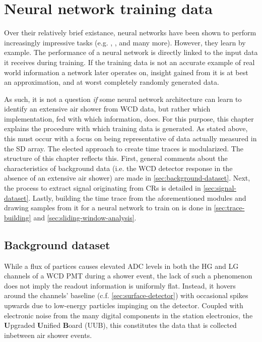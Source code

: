 

\chapter{Neural network training data}
\label{chap:neural-network-data}

Over their relatively brief existance, neural networks have been shown to perform increasingly impressive tasks (e.g.  \cite{openai2019dota}, \cite{openai2023gpt4}, 
and many more). However, they learn by example. The performance of a neural network is directly linked to the input data it receives during training. If the 
training data is not an accurate example of real world information a network later operates on, insight gained from it is at best an approximation, and at worst
completely randomly generated data. 

As such, it is not a question \textit{if} some neural network architecture can learn to identify an extensive air shower from WCD data, but rather which 
implementation, fed with which information, does. For this purpose, this chapter explains the procedure with which training data is generated. As stated above, this
must occur with a focus on being representative of data actually measured in the SD array. The elected approach to create time traces is modularized. The structure
of this chapter reflects this. First, general comments about the characteristics of background data (i.e. the WCD detector response in the absence of an extensive 
air shower) are made in \autoref{sec:background-dataset}. Next, the process to extract signal originating from CRs is detailed in \autoref{sec:signal-dataset}.
Lastly, building the time trace from the aforementioned modules and drawing samples from it for a neural network to train on is done in \autoref{sec:trace-building}
and \autoref{sec:sliding-window-analysis}.

\section{Background dataset}
\label{sec:background-dataset}

While a flux of partices causes elevated ADC levels in both the HG and LG channels of a WCD PMT during a shower event, the lack of such a phenomenon does not imply 
the readout information is uniformly flat. Instead, it hovers around the channels' baseline (c.f. \autoref{sec:surface-detector}) with occasional spikes upwards 
due to low-energy particles impinging on the detector. Coupled with electronic noise from the many digital components in the station electronics, the 
\textbf{U}pgraded \textbf{U}nified \textbf{B}oard (UUB), this constitutes the data that is collected inbetween air shower events.


